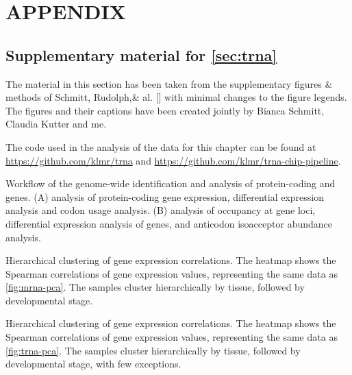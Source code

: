 \clearpage
{}
{}
\part*{\Huge\bfseries{}APPENDIX}
\label{sec:appendix}

\setcounter{chapter}{0}
\renewcommand\thechapter{\Alph{chapter}}

\chapter{Supplementary material for \texorpdfstring{\cref*{sec:trna}}{chapter 2}}

The material in this section has been taken from the supplementary figures \&
methods of Schmitt, Rudolph,\andothersdelim\& al. [\cite*{Schmitt:2014}] with
minimal changes to the figure legends. The figures and their captions have been
created jointly by Bianca Schmitt, Claudia Kutter and me.

The code used in the analysis of the data for this chapter can be found at
\url{https://github.com/klmr/trna} and
\url{https://github.com/klmr/trna-chip-pipeline}.

\begingroup
\renewcommand*\floatpos{H}

\thispagestyle{empty}
    {Workflow of the genome-wide identification and analysis of protein-coding
    and \trna genes.}
    {(A) \rnaseq analysis of protein-coding gene expression, differential
    expression analysis and codon usage analysis. (B) \chipseq analysis of 
    occupancy at \trna gene loci, differential expression analysis of \trna
    genes, and anticodon isoacceptor abundance analysis.}



    {Hierarchical clustering of \mrna gene expression correlations.}
    {The heatmap shows the Spearman correlations of \mrna gene expression values,
    representing the same data as \cref{fig:mrna-pca}. The samples cluster
    hierarchically by tissue, followed by developmental stage.}

    {Hierarchical clustering of \trna gene expression correlations.}
    {The heatmap shows the Spearman correlations of \trna gene expression values,
    representing the same data as \cref{fig:trna-pca}. The samples cluster
    hierarchically by tissue, followed by developmental stage, with few
    exceptions.}

